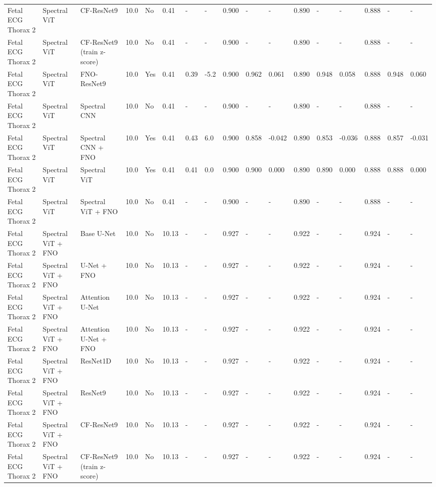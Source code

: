 \begin{longtable}{lllllllllllllllll}
Fetal ECG Thorax 2 & Spectral ViT & CF-ResNet9 & 10.0 & No & 0.41 & - & - & 0.900 & - & - & 0.890 & - & - & 0.888 & - & - \\
Fetal ECG Thorax 2 & Spectral ViT & CF-ResNet9 (train z-score) & 10.0 & No & 0.41 & - & - & 0.900 & - & - & 0.890 & - & - & 0.888 & - & - \\
Fetal ECG Thorax 2 & Spectral ViT & FNO-ResNet9 & 10.0 & Yes & 0.41 & 0.39 & -5.2 & 0.900 & 0.962 & 0.061 & 0.890 & 0.948 & 0.058 & 0.888 & 0.948 & 0.060 \\
Fetal ECG Thorax 2 & Spectral ViT & Spectral CNN & 10.0 & No & 0.41 & - & - & 0.900 & - & - & 0.890 & - & - & 0.888 & - & - \\
Fetal ECG Thorax 2 & Spectral ViT & Spectral CNN + FNO & 10.0 & Yes & 0.41 & 0.43 & 6.0 & 0.900 & 0.858 & -0.042 & 0.890 & 0.853 & -0.036 & 0.888 & 0.857 & -0.031 \\
Fetal ECG Thorax 2 & Spectral ViT & Spectral ViT & 10.0 & Yes & 0.41 & 0.41 & 0.0 & 0.900 & 0.900 & 0.000 & 0.890 & 0.890 & 0.000 & 0.888 & 0.888 & 0.000 \\
Fetal ECG Thorax 2 & Spectral ViT & Spectral ViT + FNO & 10.0 & No & 0.41 & - & - & 0.900 & - & - & 0.890 & - & - & 0.888 & - & - \\
Fetal ECG Thorax 2 & Spectral ViT + FNO & Base U-Net & 10.0 & No & 10.13 & - & - & 0.927 & - & - & 0.922 & - & - & 0.924 & - & - \\
Fetal ECG Thorax 2 & Spectral ViT + FNO & U-Net + FNO & 10.0 & No & 10.13 & - & - & 0.927 & - & - & 0.922 & - & - & 0.924 & - & - \\
Fetal ECG Thorax 2 & Spectral ViT + FNO & Attention U-Net & 10.0 & No & 10.13 & - & - & 0.927 & - & - & 0.922 & - & - & 0.924 & - & - \\
Fetal ECG Thorax 2 & Spectral ViT + FNO & Attention U-Net + FNO & 10.0 & No & 10.13 & - & - & 0.927 & - & - & 0.922 & - & - & 0.924 & - & - \\
Fetal ECG Thorax 2 & Spectral ViT + FNO & ResNet1D & 10.0 & No & 10.13 & - & - & 0.927 & - & - & 0.922 & - & - & 0.924 & - & - \\
Fetal ECG Thorax 2 & Spectral ViT + FNO & ResNet9 & 10.0 & No & 10.13 & - & - & 0.927 & - & - & 0.922 & - & - & 0.924 & - & - \\
Fetal ECG Thorax 2 & Spectral ViT + FNO & CF-ResNet9 & 10.0 & No & 10.13 & - & - & 0.927 & - & - & 0.922 & - & - & 0.924 & - & - \\
Fetal ECG Thorax 2 & Spectral ViT + FNO & CF-ResNet9 (train z-score) & 10.0 & No & 10.13 & - & - & 0.927 & - & - & 0.922 & - & - & 0.924 & - & - \\

\end{longtable}
